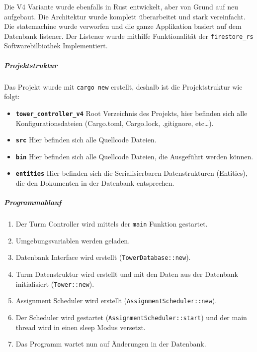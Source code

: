 Die V4 Variante wurde ebenfalls in Rust entwickelt, aber von Grund auf neu aufgebaut. Die Architektur wurde komplett überarbeitet und stark vereinfacht. Die \Gls{statemachine} wurde verworfen und die ganze Applikation basiert auf dem Datenbank \Gls{listener}. Der Listener wurde mithilfe Funktionalität der \texttt{firestore\_rs} Softwarebilbiothek Implementiert.

\subparagraph{Projektstruktur}

Das Projekt wurde mit \texttt{cargo new} erstellt, deshalb ist die Projektstruktur wie folgt:


\begin{itemize}
  \item \textbf{\texttt{tower\_controller\_v4}} Root Verzeichnis des Projekts, hier befinden sich alle    Konfigurationsdateien (Cargo.toml, Cargo.lock, .gitignore, etc\ldots{}).
  \item \textbf{\texttt{src}} Hier befinden sich alle Quellcode Dateien.
  \item \textbf{\texttt{bin}} Hier befinden sich alle Quellcode Dateien, die Ausgeführt werden können.
  \item \textbf{\texttt{entities}} Hier befinden sich die Serialisierbaren Datenstrukturen (Entities), die den Dokumenten in der Datenbank entsprechen.
\end{itemize}

\subparagraph{Programmablauf}
\begin{enumerate}
  \item Der Turm Controller wird mittels der \texttt{main} Funktion gestartet.
  \item Umgebungsvariablen werden geladen.
  \item Datenbank Interface wird erstellt (\texttt{TowerDatabase::new}).
  \item Turm Datenstruktur wird erstellt und mit den Daten aus der Datenbank initialisiert (\texttt{Tower::new}).
  \item Assignment Scheduler wird erstellt (\texttt{AssignmentScheduler::new}).
  \item Der Scheduler wird gestartet (\texttt{AssignmentScheduler::start}) und der main \Gls{thread} wird in einen \Gls{sleep} Modus versetzt.
  \item Das Programm wartet nun auf Änderungen in der Datenbank.
\end{enumerate}

